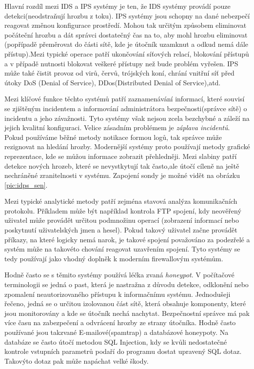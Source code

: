 \documentclass[11pt,a4paper]{article}
\begin{document}
Hlavní rozdíl mezi IDS a IPS systémy je ten, že IDS systémy provádí pouze detekci(neodstraňují hrozbu z toku). IPS systémy jsou schopny na dané nebezpečí reagovat změnou konfigurace prostředí. Mohou tak určitým způsobem eliminovat počáteční hrozbu a dát správci dostatečný čas na to, aby mohl hrozbu eliminovat (popřípadě přeměrovat do části sítě, kde je útočník uzamknut a odkud nemá dále přístup).Mezi typické operace patří ukončování síťových relací, blokování přístupů a v případě nutnosti blokovat veškeré přístupy než bude problém vyřešen. IPS může také čistit provoz od virů, červů, trójských koní, chrání vnitřní síť před útoky DoS (Denial of Service), DDos(Distributed Denial of Service),atd.

Mezi klíčové funkce těchto systémů patří zaznamenávání informací, které souvisí se zjištěným incidentem a informování administrátora bezpečnosti(správce sítě) o incidentu a jeho závažnosti. Tyto systémy však nejsou zcela bezchybné a záleží na jejich kvalitní konfiguraci. Velice zásadním problémem je \textit{záplava incidentů}. Pokud používáme běžné metody notikace formou logů, tak správce může rezignovat na hledání hrozby. Modernější systémy proto používají metody grafické reprezentace, kde se můžou informace zobrazit přehledněji. Mezi slabiny patří detekce nových hrozeb, které se nevystkytují tak často,ale útočí cíleně na ještě nechráněné zranitelnosti v systému. Zapojení sondy je možné vidět na obrázku \ref{pic:idps_sen}.

Mezi typické analytické metody patří zejména stavová analýza komunikačních protokolu. Příkladem může být například kontrola FTP spojení, kdy neověřený uživatel může provádět určitou podmnožinu operací (zobrazení informací nebo poskytnutí uživatelských jmen a hesel). Pokud takový uživatel začne provádět příkazy, na které logicky nemá narok, je takové spojení považováno za podezřelé a systém může na takovéto chování reagovat uzavřením spojení. Tyto systémy se tedy používají jako vhodný doplněk k moderním firewallovým systémům.

Hodně často se s těmito systémy používá léčka zvaná \textit{honeypot}. V počítačové terminologii se jedná o past, která je nastražna z důvodu detekce, odklonění nebo zpomalení neautorizovaného přístupu k informačnímu systému. Jednodušeji řečeno, jedná se o určitou izolovanou část sítě, která obsahuje komponenty, které jsou monitorovány a kde se útočník nechá nachytat. Bezpečnostní správce má pak více času na zabezpečení a odvrácení hrozby ze strany útočníka. Hodně často používané jsou takzvané E-mailové(spamtrap) a databázové honeypoty. Na databáze se často útočí metodou SQL Injection, kdy se kvůli nedostatečné kontrole vstupních parametrů podaří do programu dostat upravený SQL dotaz. Takovýto dotaz pak může napáchat velké škody. 
\end{document}
